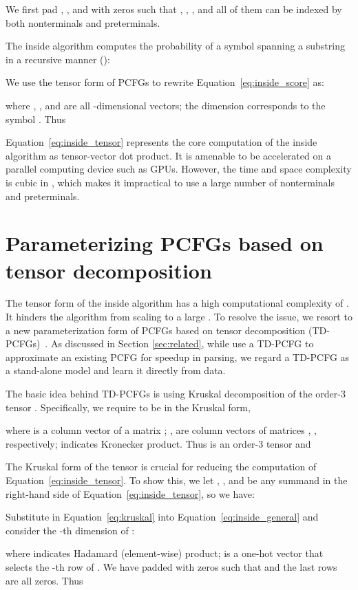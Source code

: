 \documentclass[11pt]{article}
\begin{document}
We first pad , , and  with zeros such that ,  , ,
and all of them can be indexed by both nonterminals and preterminals.


The inside algorithm computes the probability of a symbol  spanning a substring  in a recursive manner ():

We use the tensor form of PCFGs to rewrite Equation~\ref{eq:inside_score} as:

where , , and  are all -dimensional vectors; 
the dimension  corresponds to the symbol . 
Thus


Equation~\ref{eq:inside_tensor} represents the core computation of the inside algorithm as tensor-vector dot product.
It is amenable to be accelerated on a parallel computing device such as GPUs.
However, the time and space complexity is cubic in ,
which makes it impractical to use a large number of nonterminals and preterminals.


\section{Parameterizing PCFGs based on tensor decomposition}\label{sec:td-pcfg}

The tensor form of the inside algorithm has a high computational complexity of .
It hinders the algorithm from scaling to a large .
To resolve the issue, we resort to a new parameterization form of PCFGs based on tensor decomposition (TD-PCFGs)~\citep{cohen-etal-2013-approximate}.
As discussed in Section \ref{sec:related}, while \citet{cohen-etal-2013-approximate} use a TD-PCFG to approximate an existing PCFG for speedup in parsing,
we regard a TD-PCFG as a stand-alone model and learn it directly from data.

The basic idea behind TD-PCFGs is using Kruskal decomposition of the order-3 tensor .
Specifically, we require  to be in the Kruskal form, 

where  is a column vector of a matrix ; ,  are column vectors of matrices , , respectively;
 indicates Kronecker product.
Thus  is an order-3 tensor 
and 


The Kruskal form of the tensor  is crucial for reducing the computation of Equation~\ref{eq:inside_tensor}.
To show this, we let , , and  be any summand in the right-hand side of Equation~\ref{eq:inside_tensor}, so we have:

Substitute  in Equation~\ref{eq:kruskal} into Equation~\ref{eq:inside_general} and consider the -th dimension of :

where  indicates Hadamard (element-wise) product;
 is a one-hot vector that selects the -th row of . 
We have padded  with zeros such that  and the last  rows are all zeros.
Thus
\end{document}
